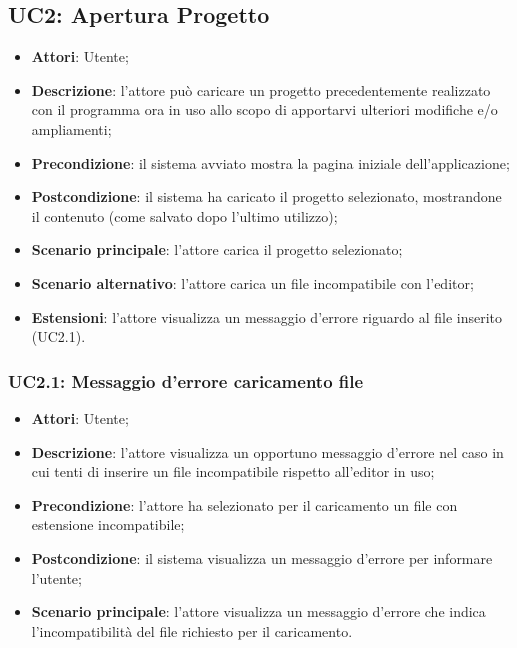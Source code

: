 \subsection{UC2: Apertura Progetto}
\label{UC2}
\begin{itemize}
	\item \textbf{Attori}: Utente;
	\item \textbf{Descrizione}: l'attore può caricare un progetto precedentemente realizzato con il programma ora in uso allo scopo di apportarvi ulteriori modifiche e/o ampliamenti;
	\item \textbf{Precondizione}: il sistema avviato mostra la pagina iniziale dell'applicazione;
	\item \textbf{Postcondizione}: il sistema ha caricato il progetto selezionato, mostrandone il contenuto (come salvato dopo l'ultimo utilizzo);
	\item \textbf{Scenario principale}: l'attore carica il progetto selezionato;
	\item \textbf{Scenario alternativo}: l'attore carica un file incompatibile con l'editor;
	\item \textbf{Estensioni}: l'attore visualizza un messaggio d'errore riguardo al file inserito (UC2.1).
\end{itemize}

\subsubsection{UC2.1: Messaggio d'errore caricamento file}
\label{UC2.1}
\begin{itemize}
	\item \textbf{Attori}: Utente;
	\item \textbf{Descrizione}: l'attore visualizza un opportuno messaggio d'errore nel caso in cui tenti di inserire un file incompatibile rispetto all'editor in uso;
	\item \textbf{Precondizione}: l'attore ha selezionato per il caricamento un file con estensione incompatibile;
	\item \textbf{Postcondizione}: il sistema visualizza un messaggio d'errore per informare l'utente;
	\item \textbf{Scenario principale}: l'attore visualizza un messaggio d'errore che indica l'incompatibilità del file richiesto per il caricamento.
\end{itemize}

